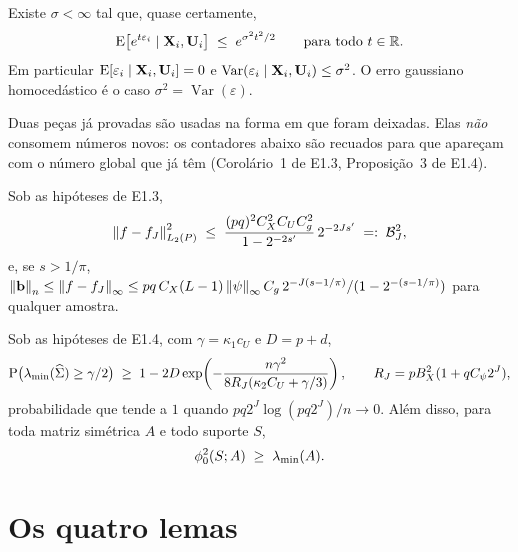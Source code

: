 \documentclass[11pt,a4paper]{article}
\newcommand{\lmin}{\lambda_{\min}}
\newcommand{\bb}{\mathbf{b}}
\begin{document}
\begin{assumption}\label{ass:subg}
Existe $\sigma < \infty$ tal que, quase certamente,
\[
  \mathrm{E}\bigl[e^{t\varepsilon_{i}} \mid \mathbf{X}_{i}, \mathbf{U}_{i}\bigr]
  \;\le\; e^{\sigma^{2}t^{2}/2} \qquad \text{para todo } t \in \mathbb{R} .
\]
Em particular $\mathrm{E}[\varepsilon_{i}\mid\mathbf{X}_{i},\mathbf{U}_{i}] = 0$ e
$\operatorname{Var}(\varepsilon_{i}\mid\mathbf{X}_{i},\mathbf{U}_{i}) \le \sigma^{2}$. O erro
gaussiano homocedástico é o caso $\sigma^{2} = \operatorname{Var}(\varepsilon)$.
\end{assumption}

Duas peças já provadas são usadas na forma em que foram deixadas. Elas
\emph{não} consomem números novos: os contadores abaixo são recuados para que
apareçam com o número global que já têm (Corolário~1 de E1.3, Proposição~3 de
E1.4).

\setcounter{corollary}{0}
\begin{corollary}\label{cor:vies-E13}
Sob as hipóteses de E1.3,
\[
  \left\lVert f - f_{J} \right\rVert_{L_{2}(P)}^{2}
  \;\le\; \frac{(pq)^{2}C_{X}^{2}C_{U}C_{g}^{2}}{1 - 2^{-2s'}}\,2^{-2Js'}
  \;=:\; \mathcal{B}_{J}^{2},
\]
e, se $s > 1/\pi$, $\normn{\bb} \le \norm{f - f_{J}}_{\infty} \le
pq\,C_{X}(L-1)\norm{\psi}_{\infty}C_{g}\,2^{-J(s-1/\pi)}/(1 - 2^{-(s-1/\pi)})$
para qualquer amostra.
\end{corollary}

\setcounter{proposition}{2}
\begin{proposition}\label{prop:gram-E14}
Sob as hipóteses de E1.4, com $\gamma = \kappa_{1}c_{U}$ e
$D = p + d$,
\[
  \Prob\bigl(\lmin(\Gramhat) \ge \gamma/2\bigr)
  \;\ge\; 1 - 2D\exp\!\left(-\frac{n\gamma^{2}}{8R_{J}(\kappa_{2}C_{U} + \gamma/3)}\right),
  \qquad R_{J} = pB_{X}^{2}(1 + qC_{\psi}2^{J}),
\]
probabilidade que tende a $1$ quando $pq2^{J}\log(pq2^{J})/n \to 0$. Além
disso, para toda matriz simétrica $A$ e todo suporte $S$,
\begin{equation}
  \label{eq:compat-lmin-E14}
  \compat^{2}(S; A) \;\ge\; \lmin(A).
\end{equation}
\end{proposition}

\setcounter{corollary}{1}   %

\section{Os quatro lemas}
\end{document}

